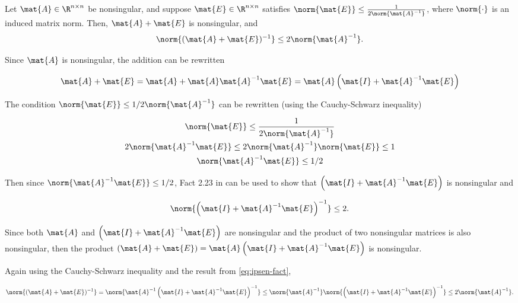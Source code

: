 \documentclass{template}
\begin{document}
\section{}
Let $\mat{A} \in \R^{n\times n}$ be nonsingular, and suppose $\mat{E} \in \R^{n\times n}$
satisfies $\norm{\mat{E}} \leq \frac{1}{2\norm{\mat{A}^{-1}}}$, where $\norm{\cdot}$ is an 
induced matrix norm.  
Then, $\mat{A}+\mat{E}$ is nonsingular, and
\[
   \norm{(\mat{A} + \mat{E})^{-1}} \leq 2 \norm{\mat{A}^{-1}}.
\]


Since $\mat{A}$ is nonsingular, the addition can be rewritten

\begin{equation}\label{eq:decomposition}
    \mat{A} + \mat{E} = \mat{A} + \mat{A}\mat{A}^{-1}\mat{E} = \mat{A} \left( \mat{I} + \mat{A}^{-1}\mat{E} \right)
\end{equation}

The condition $\norm{\mat{E}} \leq 1/2\norm{\mat{A}^{-1}}$ can be rewritten (using the Cauchy-Schwarz inequality)

\begin{equation}\label{eq:norm-inequality}
    \begin{gathered}
        \norm{\mat{E}} \leq \frac{1}{2\norm{\mat{A}^{-1}}}\\
        2\norm{\mat{A}^{-1}\mat{E}}\leq2\norm{\mat{A}^{-1}}\norm{\mat{E}} \leq 1\\
        \norm{\mat{A}^{-1}\mat{E}}\leq 1/2
\end{gathered}
\end{equation}


Then since $\norm{\mat{A}^{-1}\mat{E}} \leq 1/2$, Fact 2.23 in \cite{ipsen2009numerical} can be used to show that $\left( \mat{I} + \mat{A}^{-1}\mat{E} \right)$ is nonsingular and 

\begin{equation}\label{eq:ipsen-fact}
    \norm{\left( \mat{I} + \mat{A}^{-1}\mat{E} \right)^{-1}} \leq 2.
\end{equation}


Since both $\mat{A}$ and $\left( \mat{I} + \mat{A}^{-1}\mat{E} \right)$ are nonsingular and the product of two nonsingular matrices is also nonsingular, then the product $(\mat{A} + \mat{E}) = \mat{A}\left( \mat{I} + \mat{A}^{-1}\mat{E} \right)$ is nonsingular.

Again using the Cauchy-Schwarz inequality and the result from \autoref{eq:ipsen-fact}, 

\begin{equation}
    \norm{(\mat{A}+\mat{E})^{-1}} = \norm{\mat{A}^{-1}\left( \mat{I} + \mat{A}^{-1}\mat{E} \right)^{-1}} \leq \norm{\mat{A}^{-1}}\norm{\left( \mat{I} + \mat{A}^{-1}\mat{E} \right)^{-1}} \leq 2\norm{\mat{A}^{-1}}.
\end{equation}
\end{document}
